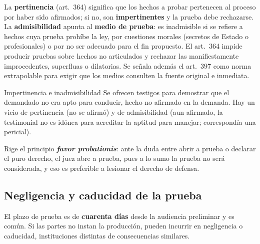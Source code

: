 \documentclass[12pt,oneside]{book}
\begin{document}
La \textbf{pertinencia} (art.~364) significa que los hechos a probar pertenecen al proceso por haber sido afirmados; si no, son \textbf{impertinentes} y la prueba debe rechazarse. La \textbf{admisibilidad} apunta al \textbf{medio de prueba}: es inadmisible si se refiere a hechos cuya prueba prohíbe la ley, por cuestiones morales (secretos de Estado o profesionales) o por no ser adecuado para el fin propuesto. El art.~364 impide producir pruebas sobre hechos no articulados y rechazar las manifiestamente improcedentes, superfluas o dilatorias. Se señala además el art.~397 como norma extrapolable para exigir que los medios consulten la fuente original e inmediata. %

\begin{example}{Impertinencia e inadmisibilidad}
Se ofrecen testigos para demostrar que el demandado no era apto para conducir, hecho no afirmado en la demanda. Hay un vicio de pertinencia (no se afirmó) y de admisibilidad (aun afirmado, la testimonial no es idónea para acreditar la aptitud para manejar; correspondía una pericial).
\end{example}

Rige el principio \textbf{\textit{favor probationis}}: ante la duda entre abrir a prueba o declarar el puro derecho, el juez abre a prueba, pues a lo sumo la prueba no será considerada, y eso es preferible a lesionar el derecho de defensa.

\subsection{Negligencia y caducidad de la prueba}

El plazo de prueba es de \textbf{cuarenta días} desde la audiencia preliminar y es común. Si las partes no instan la producción, pueden incurrir en negligencia o caducidad, instituciones distintas de consecuencias similares.
\end{document}
